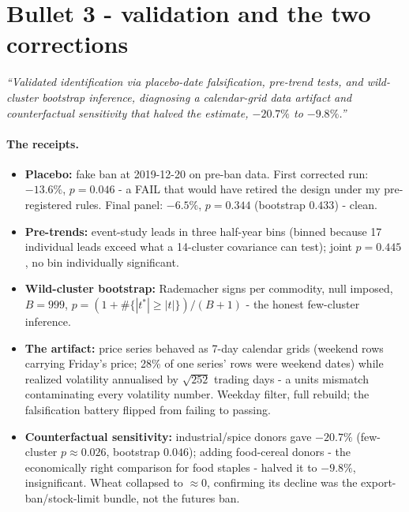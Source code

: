 \documentclass[11pt]{article}
\begin{document}
\section{Bullet 3 - validation and the two corrections}

\noindent\emph{``Validated identification via placebo-date falsification, pre-trend tests,
and wild-cluster bootstrap inference, diagnosing a calendar-grid data artifact and
counterfactual sensitivity that halved the estimate, $-20.7\%$ to $-9.8\%$.''}

\paragraph{The receipts.}
\begin{itemize}[leftmargin=1.6em,itemsep=1pt]
  \item \textbf{Placebo:} fake ban at 2019-12-20 on pre-ban data. First corrected run:
        $-13.6\%$, $p=0.046$ - a FAIL that would have retired the design under my
        pre-registered rules. Final panel: $-6.5\%$, $p=0.344$ (bootstrap $0.433$) - clean.
  \item \textbf{Pre-trends:} event-study leads in three half-year bins (binned because 17
        individual leads exceed what a 14-cluster covariance can test); joint $p=0.445$,
        no bin individually significant.
  \item \textbf{Wild-cluster bootstrap:} Rademacher signs per commodity, null imposed,
        $B=999$, $p=(1+\#\{|t^*|\ge|t|\})/(B+1)$ - the honest few-cluster inference.
  \item \textbf{The artifact:} price series behaved as 7-day calendar grids (weekend rows
        carrying Friday's price; 28\% of one series' rows were weekend dates) while
        realized volatility annualised by $\sqrt{252}$ trading days - a units mismatch
        contaminating every volatility number. Weekday filter, full rebuild; the
        falsification battery flipped from failing to passing.
  \item \textbf{Counterfactual sensitivity:} industrial/spice donors gave $-20.7\%$
        (few-cluster $p\approx0.026$, bootstrap $0.046$); adding food-cereal donors -
        the economically right comparison for food staples - halved it to $-9.8\%$,
        insignificant. Wheat collapsed to $\approx0$, confirming its decline was the
        export-ban/stock-limit bundle, not the futures ban.
\end{itemize}
\end{document}
